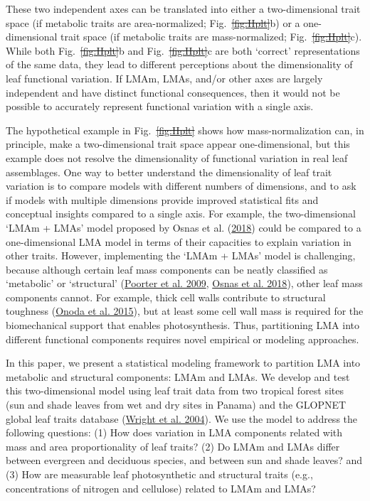 \documentclass[
  12pt,
  a4paper,
,tablecaptionabove
]{scrartcl}
\providecommand{\DIFaddtex}[1]{{\protect\color{blue}\uwave{#1}}} %
\providecommand{\DIFdeltex}[1]{{\protect\color{red}\sout{#1}}}                      %
\providecommand{\DIFaddbegin}{} %
\providecommand{\DIFaddend}{} %
\providecommand{\DIFdelbegin}{} %
\providecommand{\DIFdelend}{} %
\providecommand{\DIFadd}[1]{\texorpdfstring{\DIFaddtex{#1}}{#1}} %
\providecommand{\DIFdel}[1]{\texorpdfstring{\DIFdeltex{#1}}{}} %
\newcommand{\DIFscaledelfig}{0.5}
\newlength{\DIFdelgraphicswidth} %
\newlength{\DIFdelgraphicsheight} %
\newcommand{\DIFaddincludegraphics}[2][]{{\color{blue}\fbox{\DIFOincludegraphics[#1]{#2}}}} %
\newcommand{\DIFdelincludegraphics}[2][]{%
\sbox{\DIFdelgraphicsbox}{\DIFOincludegraphics[#1]{#2}}%
\settoboxwidth{\DIFdelgraphicswidth}{\DIFdelgraphicsbox} %
\settoboxtotalheight{\DIFdelgraphicsheight}{\DIFdelgraphicsbox} %
\scalebox{\DIFscaledelfig}{%
\parbox[b]{\DIFdelgraphicswidth}{\usebox{\DIFdelgraphicsbox}\\[-\baselineskip] \rule{\DIFdelgraphicswidth}{0em}}\llap{\resizebox{\DIFdelgraphicswidth}{\DIFdelgraphicsheight}{%
\setlength{\unitlength}{\DIFdelgraphicswidth}%
\begin{picture}(1,1)%
\thicklines\linethickness{2pt} %
{\color[rgb]{1,0,0}\put(0,0){\framebox(1,1){}}}%
{\color[rgb]{1,0,0}\put(0,0){\line( 1,1){1}}}%
{\color[rgb]{1,0,0}\put(0,1){\line(1,-1){1}}}%
\end{picture}%
}\hspace*{3pt}}} %
} %
\DeclareRobustCommand{\DIFaddbegin}{\DIFOaddbegin \let\includegraphics\DIFaddincludegraphics} %
\DeclareRobustCommand{\DIFaddend}{\DIFOaddend \let\includegraphics\DIFOincludegraphics} %
\DeclareRobustCommand{\DIFdelbegin}{\DIFOdelbegin \let\includegraphics\DIFdelincludegraphics} %
\DeclareRobustCommand{\DIFdelend}{\DIFOaddend \let\includegraphics\DIFOincludegraphics} %
\begin{document}
\DIFaddend These two independent axes can be translated into either a
two-dimensional trait space (if metabolic traits are area-normalized;
Fig.~\DIFdelbegin \DIFdel{\ref{fig:Hplt}}\DIFdelend \DIFaddbegin \DIFadd{\ref{fig-Hplt}}\DIFaddend b) or a one-dimensional trait space (if metabolic
traits are mass-normalized; Fig.~\DIFdelbegin \DIFdel{\ref{fig:Hplt}}\DIFdelend \DIFaddbegin \DIFadd{\ref{fig-Hplt}}\DIFaddend c). While both
Fig.~\DIFdelbegin \DIFdel{\ref{fig:Hplt}}\DIFdelend \DIFaddbegin \DIFadd{\ref{fig-Hplt}}\DIFaddend b and Fig.~\DIFdelbegin \DIFdel{\ref{fig:Hplt}}\DIFdelend \DIFaddbegin \DIFadd{\ref{fig-Hplt}}\DIFaddend c are both `correct'
representations of the same data, they lead to different perceptions
about the dimensionality of leaf functional variation. If LMAm, LMAs,
and/or other axes are largely independent and have distinct functional
consequences, then it would not be possible to accurately represent
functional variation with a single axis.

The hypothetical example in Fig.~\DIFdelbegin \DIFdel{\ref{fig:Hplt} }\DIFdelend \DIFaddbegin \DIFadd{\ref{fig-Hplt} }\DIFaddend shows how
mass-normalization can, in principle, make a two-dimensional trait space
appear one-dimensional, but this example does not resolve the
dimensionality of functional variation in real leaf assemblages. One way
to better understand the dimensionality of leaf trait variation is to
compare models with different numbers of dimensions, and to ask if
models with multiple dimensions provide improved statistical fits and
conceptual insights compared to a single axis. For example, the
two-dimensional `LMAm + LMAs' model proposed by Osnas et al.
(\protect\hyperlink{ref-Osnas2018}{2018}) could be compared to a
one-dimensional LMA model in terms of their capacities to explain
variation in other traits. However, implementing the `LMAm + LMAs' model
is challenging, because although certain leaf mass components can be
neatly classified as `metabolic' or `structural'
(\protect\hyperlink{ref-Poorter2009}{Poorter et al. 2009},
\protect\hyperlink{ref-Osnas2018}{Osnas et al. 2018}), other leaf mass
components cannot. For example, thick cell walls contribute to
structural toughness (\protect\hyperlink{ref-Onoda2015}{Onoda et al.
2015}), but at least some cell wall mass is required for the
biomechanical support that enables photosynthesis. Thus, partitioning
LMA into different functional components requires novel empirical or
modeling approaches.

In this paper, we present a statistical modeling framework to partition
LMA into metabolic and structural components: LMAm and LMAs. We develop
and test this two-dimensional model using leaf trait data from two
tropical forest sites (sun and shade leaves from wet and dry sites in
Panama) and the GLOPNET global leaf traits database
(\protect\hyperlink{ref-Wright2004a}{Wright et al. 2004}). We use the
model to address the following questions: (1) How does variation in LMA
components related with mass and area proportionality of leaf traits?
(2) Do LMAm and LMAs differ between evergreen and deciduous species, and
between sun and shade leaves? and (3) How are measurable leaf
photosynthetic and structural traits (e.g., concentrations of nitrogen
and cellulose) related to LMAm and LMAs?
\end{document}
